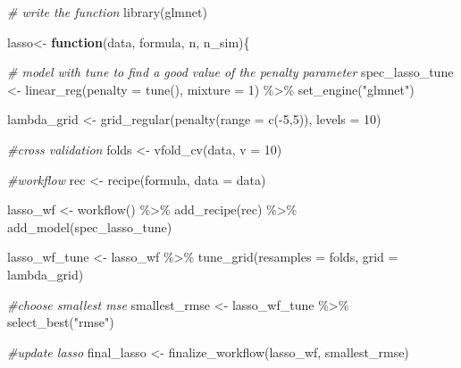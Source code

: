\documentclass[
]{article}
\newenvironment{Shaded}{\begin{snugshade}}{\end{snugshade}}
\newcommand{\AttributeTok}[1]{\textcolor[rgb]{0.77,0.63,0.00}{#1}}
\newcommand{\CommentTok}[1]{\textcolor[rgb]{0.56,0.35,0.01}{\textit{#1}}}
\newcommand{\ControlFlowTok}[1]{\textcolor[rgb]{0.13,0.29,0.53}{\textbf{#1}}}
\newcommand{\DecValTok}[1]{\textcolor[rgb]{0.00,0.00,0.81}{#1}}
\newcommand{\FunctionTok}[1]{\textcolor[rgb]{0.00,0.00,0.00}{#1}}
\newcommand{\NormalTok}[1]{#1}
\newcommand{\OtherTok}[1]{\textcolor[rgb]{0.56,0.35,0.01}{#1}}
\newcommand{\SpecialCharTok}[1]{\textcolor[rgb]{0.00,0.00,0.00}{#1}}
\newcommand{\StringTok}[1]{\textcolor[rgb]{0.31,0.60,0.02}{#1}}
\begin{document}
\begin{Shaded}
\begin{Highlighting}[]
\CommentTok{\# write the function}
\FunctionTok{library}\NormalTok{(glmnet)}

\NormalTok{lasso}\OtherTok{\textless{}{-}} \ControlFlowTok{function}\NormalTok{(data, formula, n, n\_sim)\{}
  
\CommentTok{\# model with tune to find a good value of the penalty parameter}
\NormalTok{  spec\_lasso\_tune }\OtherTok{\textless{}{-}} \FunctionTok{linear\_reg}\NormalTok{(}\AttributeTok{penalty =} \FunctionTok{tune}\NormalTok{(), }\AttributeTok{mixture =} \DecValTok{1}\NormalTok{) }\SpecialCharTok{\%\textgreater{}\%} 
    \FunctionTok{set\_engine}\NormalTok{(}\StringTok{"glmnet"}\NormalTok{)}
  
\NormalTok{  lambda\_grid }\OtherTok{\textless{}{-}} \FunctionTok{grid\_regular}\NormalTok{(}\FunctionTok{penalty}\NormalTok{(}\AttributeTok{range =} \FunctionTok{c}\NormalTok{(}\SpecialCharTok{{-}}\DecValTok{5}\NormalTok{,}\DecValTok{5}\NormalTok{)), }\AttributeTok{levels =} \DecValTok{10}\NormalTok{) }
  
\CommentTok{\#cross validation}
\NormalTok{  folds }\OtherTok{\textless{}{-}} \FunctionTok{vfold\_cv}\NormalTok{(data, }\AttributeTok{v =} \DecValTok{10}\NormalTok{) }

\CommentTok{\#workflow}
\NormalTok{  rec }\OtherTok{\textless{}{-}} \FunctionTok{recipe}\NormalTok{(formula, }\AttributeTok{data =}\NormalTok{ data)}

\NormalTok{  lasso\_wf }\OtherTok{\textless{}{-}} \FunctionTok{workflow}\NormalTok{() }\SpecialCharTok{\%\textgreater{}\%} 
    \FunctionTok{add\_recipe}\NormalTok{(rec) }\SpecialCharTok{\%\textgreater{}\%} 
    \FunctionTok{add\_model}\NormalTok{(spec\_lasso\_tune)}

\NormalTok{  lasso\_wf\_tune }\OtherTok{\textless{}{-}}\NormalTok{ lasso\_wf }\SpecialCharTok{\%\textgreater{}\%} 
    \FunctionTok{tune\_grid}\NormalTok{(}\AttributeTok{resamples =}\NormalTok{ folds,}
              \AttributeTok{grid =}\NormalTok{ lambda\_grid)}

\CommentTok{\#choose smallest mse }
\NormalTok{  smallest\_rmse }\OtherTok{\textless{}{-}}\NormalTok{ lasso\_wf\_tune }\SpecialCharTok{\%\textgreater{}\%} 
    \FunctionTok{select\_best}\NormalTok{(}\StringTok{"rmse"}\NormalTok{)}

\CommentTok{\#update lasso}
\NormalTok{  final\_lasso }\OtherTok{\textless{}{-}} \FunctionTok{finalize\_workflow}\NormalTok{(lasso\_wf, smallest\_rmse)}


\end{Highlighting}
\end{Shaded}
\end{document}
